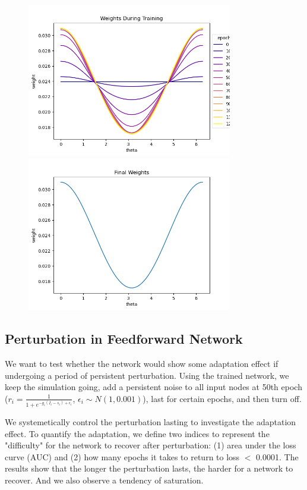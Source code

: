 \documentclass[12pt, a4paper]{article}
\begin{document}
\begin{figure}[H]
    \centering
    \includegraphics[width=0.8\textwidth]{baseline_abb05/fig/0221_abb05_bphebb_timeweights.png} \\
    \includegraphics[width=0.8\textwidth]{baseline_abb05/fig/0221_abb05_bphebb_finalweights.png}
\end{figure}
\newpage

\subsection*{Perturbation in Feedforward Network}

We want to test whether the network would show some adaptation effect if undergoing a period of persistent perturbation. Using the trained network, we keep the simulation going, add a persistent noise to all input nodes at 50th epoch ($r_i = \frac{1}{1 + e^{-g_i(I_i-s_i) + \epsilon_i}}$, $\epsilon_i \sim N(1,0.001)$), last for certain epochs, and then turn off.

We systemetically control the perturbation lasting to investigate the adaptation effect. To quantify the adaptation, we define two indices to represent the "difficulty" for the network to recover after perturbation: (1) area under the loss curve (AUC) and (2) how many epochs it takes to return to loss $<$ 0.0001. The results show that the longer the perturbation lasts, the harder for a network to recover. And we also observe a tendency of saturation.
\end{document}
